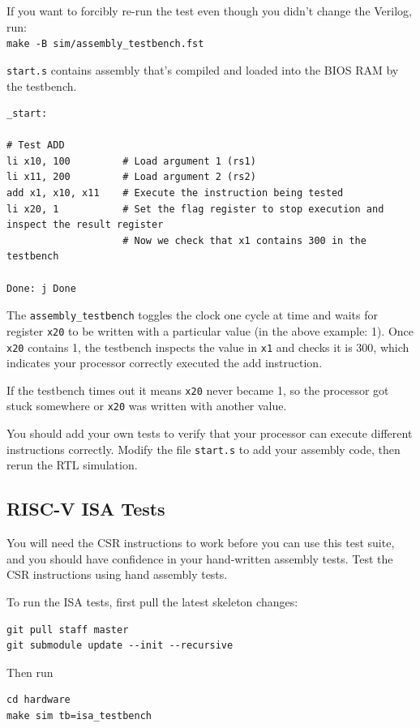 \documentclass[11pt]{article}
\begin{document}
If you want to forcibly re-run the test even though you didn't change the Verilog, run:\\
\verb|make -B sim/assembly_testbench.fst|

\verb|start.s| contains assembly that's compiled and loaded into the BIOS RAM by the testbench.
\begin{verbatim}
_start:

# Test ADD
li x10, 100         # Load argument 1 (rs1)
li x11, 200         # Load argument 2 (rs2)
add x1, x10, x11    # Execute the instruction being tested
li x20, 1           # Set the flag register to stop execution and inspect the result register
                    # Now we check that x1 contains 300 in the testbench

Done: j Done
\end{verbatim}

The \verb|assembly_testbench| toggles the clock one cycle at time and waits for register \verb|x20| to be written with a particular value (in the above example: 1).
Once \verb|x20| contains 1, the testbench inspects the value in \verb|x1| and checks it is 300, which indicates your processor correctly executed the add instruction.

If the testbench times out it means \verb|x20| never became 1, so the processor got stuck somewhere or \verb|x20| was written with another value.

You should add your own tests to verify that your processor can execute different instructions correctly. Modify the file \verb|start.s| to add your assembly code, then rerun the RTL simulation.

\subsection{RISC-V ISA Tests}\label{riscv-isa-tests}
You will need the CSR instructions to work before you can use this test suite, and you should have confidence in your hand-written assembly tests.
Test the CSR instructions using hand assembly tests.

To run the ISA tests, first pull the latest skeleton changes:
\begin{verbatim}
git pull staff master
git submodule update --init --recursive
\end{verbatim}

Then run

\begin{verbatim}
cd hardware
make sim tb=isa_testbench
\end{verbatim}
\end{document}
